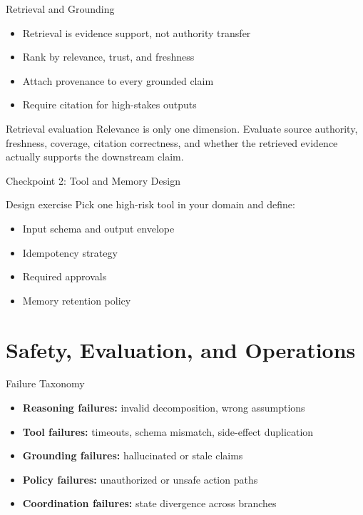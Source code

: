 \documentclass[aspectratio=169]{beamer}
\begin{document}
\begin{frame}{Retrieval and Grounding}
  \begin{itemize}
    \item Retrieval is evidence support, not authority transfer
    \item Rank by relevance, trust, and freshness
    \item Attach provenance to every grounded claim
    \item Require citation for high-stakes outputs
  \end{itemize}

  \vspace{0.5em}
  \begin{block}{Retrieval evaluation}
    Relevance is only one dimension. Evaluate source authority, freshness, coverage, citation correctness, and whether the retrieved evidence actually supports the downstream claim.
  \end{block}
\end{frame}

\begin{frame}{Checkpoint 2: Tool and Memory Design}
  \begin{examplebox}{Design exercise}
    Pick one high-risk tool in your domain and define:
    \begin{itemize}
      \item Input schema and output envelope
      \item Idempotency strategy
      \item Required approvals
      \item Memory retention policy
    \end{itemize}
  \end{examplebox}
\end{frame}

\section{Safety, Evaluation, and Operations}

\begin{frame}{Failure Taxonomy}
  \begin{itemize}
    \item \textbf{Reasoning failures:} invalid decomposition, wrong assumptions
    \item \textbf{Tool failures:} timeouts, schema mismatch, side-effect duplication
    \item \textbf{Grounding failures:} hallucinated or stale claims
    \item \textbf{Policy failures:} unauthorized or unsafe action paths
    \item \textbf{Coordination failures:} state divergence across branches
  \end{itemize}
\end{frame}
\end{document}
